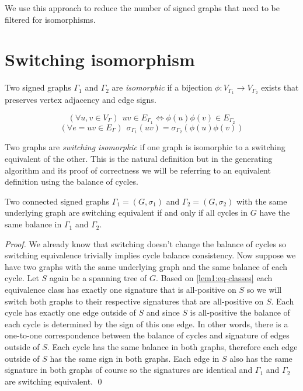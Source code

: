 We use this approach to reduce the number of signed graphs that need to be filtered for isomorphisms.

\section{Switching isomorphism}

Two signed graphs $\Gamma _1$ and $\Gamma _2$ are \textit{isomorphic} if a bijection $\phi : V _{\Gamma _1} \rightarrow V _{\Gamma _2}$ exists that preserves vertex adjacency and edge signs.

$$(\forall u,v \in V _{\Gamma}) ~~ uv \in E _{\Gamma _1} \iff \phi(u)\phi(v) \in E _{\Gamma _2}$$
$$(\forall e = uv \in E _{\Gamma}) ~~ \sigma _{\Gamma _1} (uv) = \sigma _{\Gamma _2} (\phi(u)\phi(v))$$

Two graphs are \textit{switching isomorphic} if one graph is isomorphic to a switching equivalent of the other. This is the natural definition but in the generating algorithm and its proof of correctness we will be referring to an equivalent definition using the balance of cycles.

\begin{lemma}\label{lem:cycle-switching}
    Two connected signed graphs $\Gamma _1 = (G, \sigma _1)$ and $\Gamma _2 = (G, \sigma _2)$ with the same underlying graph are switching equivalent if and only if all cycles in $G$ have the same balance in $\Gamma _1$ and $\Gamma _2$.
\end{lemma}

\textit{Proof.} We already know that switching doesn't change the balance of cycles so switching equivalence trivially implies cycle balance consistency. Now suppose we have two graphs with the same underlying graph and the same balance of each cycle. Let $S$ again be a spanning tree of $G$. Based on \cref{lem1:eq-classes} each equivalence class has exactly one signature that is all-positive on $S$ so we will switch both graphs to their respective signatures that are all-positive on $S$. Each cycle has exactly one edge outside of $S$ and since $S$ is all-positive the balance of each cycle is determined by the sign of this one edge. In other words, there is a one-to-one correspondence between the balance of cycles and signature of edges outside of $S$. Each cycle has the same balance in both graphs, therefore each edge outside of $S$ has the same sign in both graphs. Each edge in $S$ also has the same signature in both graphs of course so the signatures are identical and $\Gamma _1$ and $\Gamma _2$ are switching equivalent. \qed

